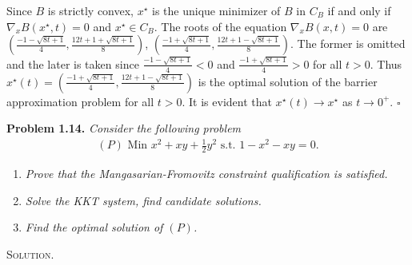 \documentclass[a4paper]{article}
\numberwithin{equation}{section}
\begin{document}
\begin{enumerate}
Since $B$ is strictly convex, $x^\star$ is the unique minimizer of $B$ in $C_B$ if and only if $\nabla _x B\left( {{x^\star},t} \right) = 0$ and $x^\star \in C_B$. The roots of the equation $\nabla _x B\left( {x,t} \right) = 0$ are $\left( {\frac{{ - 1 - \sqrt {8t + 1} }}{4},\frac{{12t + 1 + \sqrt {8t + 1} }}{8}} \right)$, $\left( {\frac{{ - 1 + \sqrt {8t + 1} }}{4},\frac{{12t + 1 - \sqrt {8t + 1} }}{8}} \right)$. The former is omitted and the later is taken since ${\frac{{ - 1 - \sqrt {8t + 1} }}{4}} <0$ and ${\frac{{ - 1 + \sqrt {8t + 1} }}{4}} >0$ for all $t>0$. Thus $x^\star \left(t\right) = \left( {\frac{{ - 1 + \sqrt {8t + 1} }}{4},\frac{{12t + 1 - \sqrt {8t + 1} }}{8}} \right)$ is the optimal solution of the barrier approximation problem for all $t>0$. It is evident that $x^\star \left(t\right) \to x^\star$ as $t\to 0^+$. \hfill $\square$
\end{enumerate}
\textbf{Problem 1.14.} \textit{Consider the following problem}
\begin{align}
\left( P \right) \mbox{ Min } {x^2} + xy + \frac{1}{2}{y^2} \mbox{ s.t. } 1 - {x^2} - xy = 0.
\end{align}
\begin{enumerate}
\item \textit{Prove that the Mangasarian-Fromovitz constraint qualification is satisfied.}
\item \textit{Solve the KKT system, find candidate solutions.}
\item \textit{Find the optimal solution of $\left(P\right)$.}
\end{enumerate}
\textsc{Solution.}
\end{document}
